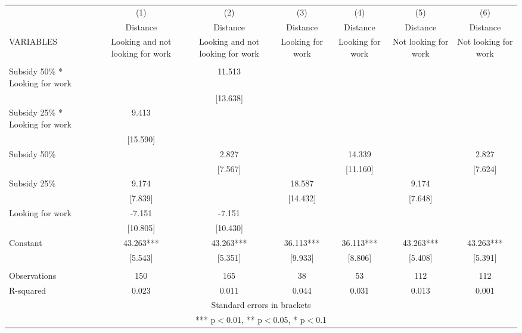 \begin{tabular}{lcccccc} \hline
 & (1) & (2) & (3) & (4) & (5) & (6) \\
 & Distance & Distance & Distance & Distance & Distance & Distance \\
VARIABLES & Looking and not looking for work & Looking and not looking for work & Looking for work & Looking for work & Not looking for work & Not looking for work \\ \hline
 &  &  &  &  &  &  \\
Subsidy 50\% * Looking for work &  & 11.513 &  &  &  &  \\
 &  & [13.638] &  &  &  &  \\
Subsidy 25\% * Looking for work & 9.413 &  &  &  &  &  \\
 & [15.590] &  &  &  &  &  \\
Subsidy 50\% &  & 2.827 &  & 14.339 &  & 2.827 \\
 &  & [7.567] &  & [11.160] &  & [7.624] \\
Subsidy 25\% & 9.174 &  & 18.587 &  & 9.174 &  \\
 & [7.839] &  & [14.432] &  & [7.648] &  \\
Looking for work & -7.151 & -7.151 &  &  &  &  \\
 & [10.805] & [10.430] &  &  &  &  \\
Constant & 43.263*** & 43.263*** & 36.113*** & 36.113*** & 43.263*** & 43.263*** \\
 & [5.543] & [5.351] & [9.933] & [8.806] & [5.408] & [5.391] \\
 &  &  &  &  &  &  \\
Observations & 150 & 165 & 38 & 53 & 112 & 112 \\
 R-squared & 0.023 & 0.011 & 0.044 & 0.031 & 0.013 & 0.001 \\ \hline
\multicolumn{7}{c}{ Standard errors in brackets} \\
\multicolumn{7}{c}{ *** p$<$0.01, ** p$<$0.05, * p$<$0.1} \\
\end{tabular}

